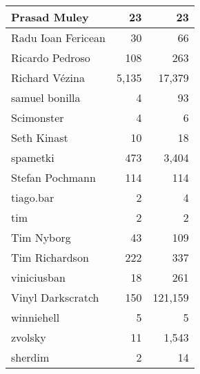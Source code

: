 \documentclass[a4paper,man,natbib,floatsintext]{apa6}
\begin{document}
\begin{table}[ht]
\begin{tabular}{|l|r|r|}
Prasad Muley                   & 23              & 23            \\ \hline
Radu Ioan Fericean             & 30              & 66            \\ \hline
Ricardo Pedroso                & 108             & 263           \\ \hline
Richard Vézina                 & 5,135           & 17,379        \\ \hline
samuel bonilla                 & 4               & 93            \\ \hline
Scimonster                     & 4               & 6             \\ \hline
Seth Kinast                    & 10              & 18            \\ \hline
spametki                       & 473             & 3,404         \\ \hline
Stefan Pochmann                & 114             & 114           \\ \hline
tiago.bar                      & 2               & 4             \\ \hline
tim                            & 2               & 2             \\ \hline
Tim Nyborg                     & 43              & 109           \\ \hline
Tim Richardson                 & 222             & 337           \\ \hline
viniciusban                    & 18              & 261           \\ \hline
Vinyl Darkscratch              & 150             & 121,159       \\ \hline
winniehell                     & 5               & 5             \\ \hline
zvolsky                        & 11              & 1,543         \\ \hline
sherdim                        & 2               & 14            \\ \hline
\end{tabular}
\end{table}
   \setlength{\parindent}{4em}
   
\end{document}
